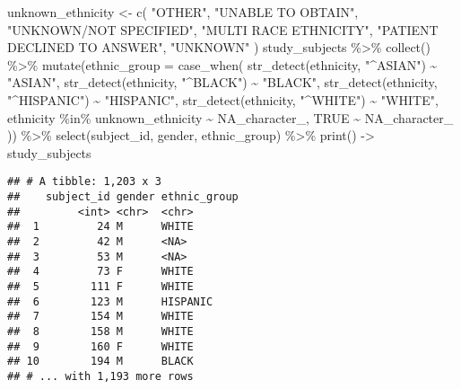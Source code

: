 \documentclass[
]{article}
\newenvironment{Shaded}{\begin{snugshade}}{\end{snugshade}}
\newcommand{\AttributeTok}[1]{\textcolor[rgb]{0.77,0.63,0.00}{#1}}
\newcommand{\ConstantTok}[1]{\textcolor[rgb]{0.00,0.00,0.00}{#1}}
\newcommand{\FunctionTok}[1]{\textcolor[rgb]{0.00,0.00,0.00}{#1}}
\newcommand{\NormalTok}[1]{#1}
\newcommand{\OtherTok}[1]{\textcolor[rgb]{0.56,0.35,0.01}{#1}}
\newcommand{\SpecialCharTok}[1]{\textcolor[rgb]{0.00,0.00,0.00}{#1}}
\newcommand{\StringTok}[1]{\textcolor[rgb]{0.31,0.60,0.02}{#1}}
\begin{document}
\begin{Shaded}
\begin{Highlighting}[]
\NormalTok{unknown\_ethnicity }\OtherTok{\textless{}{-}} \FunctionTok{c}\NormalTok{(}
  \StringTok{"OTHER"}\NormalTok{,}
  \StringTok{"UNABLE TO OBTAIN"}\NormalTok{,}
  \StringTok{"UNKNOWN/NOT SPECIFIED"}\NormalTok{,}
  \StringTok{"MULTI RACE ETHNICITY"}\NormalTok{,}
  \StringTok{"PATIENT DECLINED TO ANSWER"}\NormalTok{,}
  \StringTok{"UNKNOWN"}
\NormalTok{)}
\NormalTok{study\_subjects }\SpecialCharTok{\%\textgreater{}\%}
  \FunctionTok{collect}\NormalTok{() }\SpecialCharTok{\%\textgreater{}\%}
  \FunctionTok{mutate}\NormalTok{(}\AttributeTok{ethnic\_group =} \FunctionTok{case\_when}\NormalTok{(}
    \FunctionTok{str\_detect}\NormalTok{(ethnicity, }\StringTok{"\^{}ASIAN"}\NormalTok{) }\SpecialCharTok{\textasciitilde{}} \StringTok{"ASIAN"}\NormalTok{,}
    \FunctionTok{str\_detect}\NormalTok{(ethnicity, }\StringTok{"\^{}BLACK"}\NormalTok{) }\SpecialCharTok{\textasciitilde{}} \StringTok{"BLACK"}\NormalTok{,}
    \FunctionTok{str\_detect}\NormalTok{(ethnicity, }\StringTok{"\^{}HISPANIC"}\NormalTok{) }\SpecialCharTok{\textasciitilde{}} \StringTok{"HISPANIC"}\NormalTok{,}
    \FunctionTok{str\_detect}\NormalTok{(ethnicity, }\StringTok{"\^{}WHITE"}\NormalTok{) }\SpecialCharTok{\textasciitilde{}} \StringTok{"WHITE"}\NormalTok{,}
\NormalTok{    ethnicity }\SpecialCharTok{\%in\%}\NormalTok{ unknown\_ethnicity }\SpecialCharTok{\textasciitilde{}} \ConstantTok{NA\_character\_}\NormalTok{,}
    \ConstantTok{TRUE} \SpecialCharTok{\textasciitilde{}} \ConstantTok{NA\_character\_}
\NormalTok{  )) }\SpecialCharTok{\%\textgreater{}\%}
  \FunctionTok{select}\NormalTok{(subject\_id, gender, ethnic\_group) }\SpecialCharTok{\%\textgreater{}\%}
  \FunctionTok{print}\NormalTok{() }\OtherTok{{-}\textgreater{}}\NormalTok{ study\_subjects}
\end{Highlighting}
\end{Shaded}

\begin{verbatim}
## # A tibble: 1,203 x 3
##    subject_id gender ethnic_group
##         <int> <chr>  <chr>       
##  1         24 M      WHITE       
##  2         42 M      <NA>        
##  3         53 M      <NA>        
##  4         73 F      WHITE       
##  5        111 F      WHITE       
##  6        123 M      HISPANIC    
##  7        154 M      WHITE       
##  8        158 M      WHITE       
##  9        160 F      WHITE       
## 10        194 M      BLACK       
## # ... with 1,193 more rows
\end{verbatim}
\end{document}
